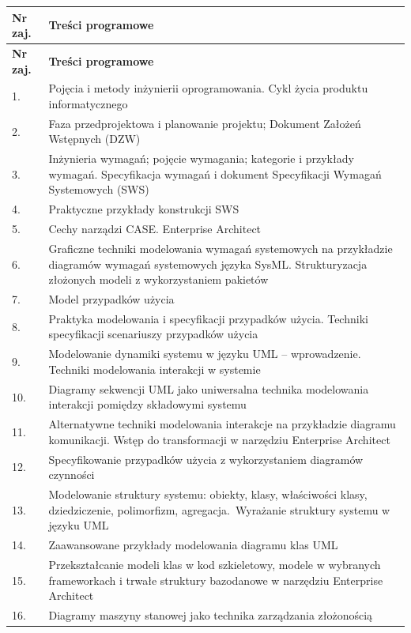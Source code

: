 \documentclass[12pt, a4paper]{article}
\newcommand{\thdrule}{\noalign{\global\setlength{\extrarowheight}{0pt}}}
\newcommand{\thdend}{\noalign{\global\setlength{\extrarowheight}{3pt}}}
\begin{document}
{\scriptsize
\begin{longtable}{m{1.5cm}m{14.5cm}}
\thdrule\toprule
\rowcolor{pjatkRed} {\color{white}\textbf{Nr zaj.}} & {\color{white}\textbf{Treści programowe}} \\
\midrule\thdend
\endfirsthead
\thdrule\toprule
\rowcolor{pjatkRed} {\color{white}\textbf{Nr zaj.}} & {\color{white}\textbf{Treści programowe}} \\
\midrule\thdend
\endhead
  \rowcolor{tableRowLight} 1. & Pojęcia i metody inżynierii oprogramowania. Cykl życia produktu informatycznego \\
  \rowcolor{tableRowAlt} 2. & Faza przedprojektowa i planowanie projektu; Dokument Założeń Wstępnych (DZW) \\
  \rowcolor{tableRowLight} 3. & Inżynieria wymagań; pojęcie wymagania; kategorie i przykłady wymagań. Specyfikacja wymagań i dokument Specyfikacji Wymagań Systemowych (SWS) \\
  \rowcolor{tableRowAlt} 4. & Praktyczne przykłady konstrukcji SWS \\
  \rowcolor{tableRowLight} 5. & Cechy narządzi CASE. Enterprise Architect \\
  \rowcolor{tableRowAlt} 6. & Graficzne techniki modelowania wymagań systemowych na przykładzie diagramów wymagań systemowych języka SysML. Strukturyzacja złożonych modeli z wykorzystaniem pakietów \\
  \rowcolor{tableRowLight} 7. & Model przypadków użycia \\
  \rowcolor{tableRowAlt} 8. & Praktyka modelowania i specyfikacji przypadków użycia. Techniki specyfikacji scenariuszy przypadków użycia \\
  \rowcolor{tableRowLight} 9. & Modelowanie dynamiki systemu w języku UML – wprowadzenie. Techniki modelowania interakcji w systemie \\
  \rowcolor{tableRowAlt} 10. & Diagramy sekwencji UML jako uniwersalna technika modelowania interakcji pomiędzy składowymi systemu \\
  \rowcolor{tableRowLight} 11. & Alternatywne techniki modelowania interakcje na przykładzie diagramu komunikacji. Wstęp do transformacji w narzędziu Enterprise Architect \\
  \rowcolor{tableRowAlt} 12. & Specyfikowanie przypadków użycia z wykorzystaniem diagramów czynności \\
  \rowcolor{tableRowLight} 13. & Modelowanie struktury systemu: obiekty, klasy, właściwości klasy, dziedziczenie, polimorfizm, agregacja. Wyrażanie struktury systemu w języku UML \\
  \rowcolor{tableRowAlt} 14. & Zaawansowane przykłady modelowania diagramu klas UML \\
  \rowcolor{tableRowLight} 15. & Przekształcanie modeli klas w kod szkieletowy, modele w wybranych frameworkach i trwałe struktury bazodanowe w narzędziu Enterprise Architect \\
  \rowcolor{tableRowAlt} 16. & Diagramy maszyny stanowej jako technika zarządzania złożonością \\
\bottomrule
\end{longtable}}
\end{document}
